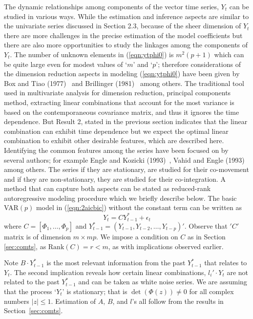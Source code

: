 The dynamic relationships among components of the vector time series, $Y_t$ can be studied in various ways. While the estimation and inference aspects are similar to the univariate series discussed in Section 2.3, because of the sheer dimension of $Y_t$ there are more challenges in the precise estimation of the model coefficients but there are also more opportunities to study the linkages among the components of $Y_t$. The number of unknown elements in (\ref{eqn:ytphi0}) is $m^2(p+1)$ which can be quite large even for modest values of `$m$' and `$p$'; therefore considerations of the dimension reduction aspects in modeling (\ref{eqn:ytphi0}) have been given by Box and Tiao (1977)~\cite{box77} and Brillinger (1981)~\cite{brill81} among others. The traditional tool used in multivariate analysis for dimension reduction, principal components method, extracting linear combinations that account for the most variance is based on the contemporaneous covariance matrix, and thus it ignores the time dependence. But Result 2, stated in the previous section indicates that the linear combination can exhibit time dependence but we expect the optimal linear combination to exhibit other desirable features, which are described here. Identifying the common features among the series have been focused on by several authors; for example Engle and Kozicki (1993)~\cite{koz93}, Vahid and Engle (1993)~\cite{vah93} among others. The series if they are stationary, are studied for their co-movement and if they are non-stationary, they are studied for their co-integration. A method that can capture both aspects can be stated as reduced-rank autoregressive modeling procedure which we briefly describe below. The basic VAR$(p)$ model in (\ref{eqn:2aicbic}) without the constant term can be written as
	\begin{equation}\label{eqn:2ytcyt}
	Y_t = CY_{t-1}^*+\epsilon_t
	\end{equation}
where $C=[\Phi_1,\ldots,\Phi_p]$ and $Y_{t-1}^*=(Y_{t-1},Y_{t-2},\ldots,Y_{t-p})'$. Observe that $'C'$ matrix is of dimension $m \times mp$. We impose a condition on $C$ as in Section \ref{sec:comts}, as $\text{Rank}(C)=r < m$, as with implications observed earlier.  


Note $B\cdot Y_{t-1}^*$ is the most relevant information from the past $Y_{t-1}^*$ that relates to $Y_t$. The second implication reveals how certain linear combinations, $l_i' \cdot Y_t$ are not related to the past $Y_{t-1}^*$ and can be taken as white noise series. We are assuming that the process `$Y_t$' is stationary; that is $\det(\Phi(z))\neq 0$ for all complex numbers $\left| z \right| \leq 1$. Estimation of $A$, $B$, and $l$'s all follow from the results in Section~\ref{sec:comts}. 



